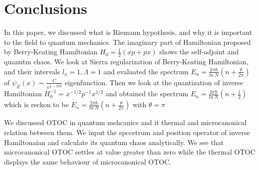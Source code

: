 \documentclass[12pt]{report}
\newcommand*{\1}{\hspace{1pt}}
\begin{document}
        
        
        
        
        
        
        
        \newpage

        \chapter{Conclusions}

        In this paper, we discussed what is Riemann hypothesis, and why it is important to the field to quantum mechanics. The imaginary part of Hamiltonian proposed by 
        Berry-Keating Hamiltonian $H_{0} = \frac{1}{2}(xp+px)$ shows the self-adjoint and quanutm chaos. We look at Sierra regularization of Berry-Keating Hamiltonian, and 
        their intervals $l_{x}=1, \Lambda=1$ and evaluated the spectrum $E_{n} = \frac{2\pi \hbar}{ln \ N}(n+\frac{\theta}{2\pi})$ of $\psi_{E}(x) = \frac{C}{x^{\frac{1}{2}-iE\hbar}}$
        eigenfunction. Then we look at the quantization of inverse Hamiltonian $H_{0}^{-1} = x^{-1/2}p^{-1}x^{1/2} $ and obtained the spectrum $E_{n} = \frac{2\pi \hbar}{ln \ N}(n+\frac{1}{2})$
        which is reckon to be $E_{n} = \frac{2\pi \hbar}{ln \ N}(n+\frac{\theta}{2\pi})$ with $\theta = \pi$

        We discussed OTOC in quantum mehcanics and it thermal and microcanonical relation between them. We input the spccetrum and position operator of inverse Hamiltonaian 
        and calculate its quantum chaos analytically. We see that microcanonical OTOC settles at value greater than zero while the thermal OTOC displays the same behaviour
        of microcanonical OTOC.
    
    
\end{document}
